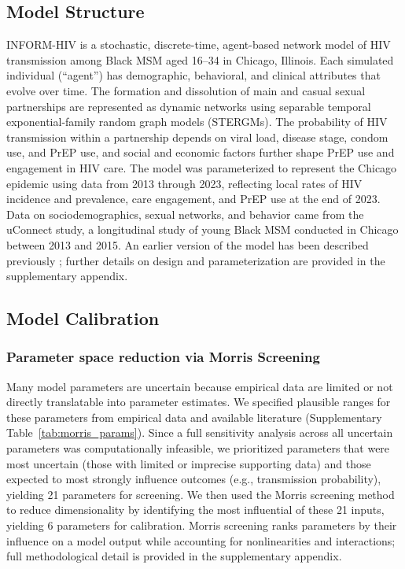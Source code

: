 \documentclass[preprint,12pt]{elsarticle}
\begin{document}
\subsection{Model Structure}
\label{sec:methods-model-structure}
INFORM-HIV is a stochastic, discrete-time, agent-based network model of HIV transmission among Black MSM aged 16--34 in Chicago, Illinois. Each simulated individual (``agent'') has demographic, behavioral, and clinical attributes that evolve over time. The formation and dissolution of main and casual sexual partnerships are represented as dynamic networks using separable temporal exponential-family random graph models (STERGMs). The probability of HIV transmission within a partnership depends on viral load, disease stage, condom use, and PrEP use, and social and economic factors further shape PrEP use and engagement in HIV care. The model was parameterized to represent the Chicago epidemic using data from 2013 through 2023, reflecting local rates of HIV incidence and prevalence, care engagement, and PrEP use at the end of 2023. Data on sociodemographics, sexual networks, and behavior came from the uConnect study, a longitudinal study of young Black MSM conducted in Chicago between 2013 and 2015.\cite{schneider_at_2017, schneider_skaathun_2017, khanna_preexposure_2016} An earlier version of the model has been described previously \cite{khanna_modeling_2019}; further details on design and parameterization are provided in the supplementary appendix.

\subsection{Model Calibration}
\label{sec:methods-calibration}

\subsubsection{Parameter space reduction via Morris Screening} 
Many model parameters are uncertain because empirical data are limited or not directly translatable into parameter estimates. We specified plausible ranges for these parameters from empirical data and available literature (Supplementary Table~\ref{tab:morris_params}). Since a full sensitivity analysis across all uncertain parameters was computationally infeasible, we prioritized parameters that were most uncertain (those with limited or imprecise supporting data) and those expected to most strongly influence outcomes (e.g., transmission probability), yielding 21 parameters for screening. We then used the Morris screening method \cite{morris1991factorial, campolongo2007effective} to reduce dimensionality by identifying the most influential of these 21 inputs, yielding 6 parameters for calibration. Morris screening ranks parameters by their influence on a model output while accounting for nonlinearities and interactions; full methodological detail is provided in the supplementary appendix.
\end{document}
